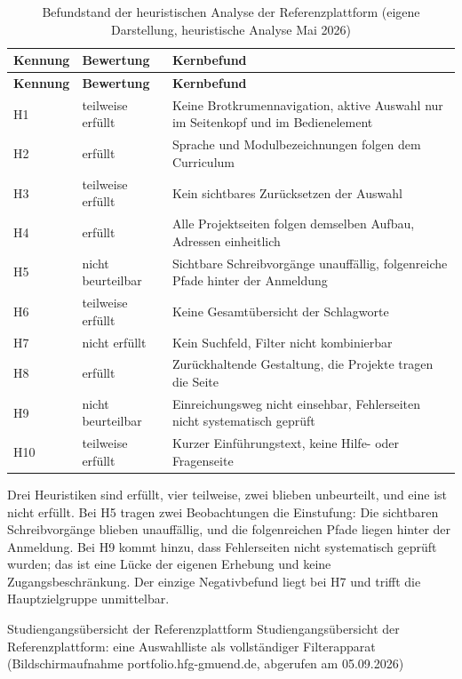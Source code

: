 \begingroup
\small
\setlength{\tabcolsep}{4pt}
\begin{longtable}{@{}L{1.7cm}L{3.1cm}L{9.6cm}@{}}
	\caption[Befundstand der heuristischen Analyse der Referenzplattform]{Befundstand der heuristischen Analyse der Referenzplattform (eigene Darstellung, heuristische Analyse Mai 2026)}
	\label{tab:hfg-befunde}\\
	\toprule
	\textbf{Kennung} & \textbf{Bewertung} & \textbf{Kernbefund} \\
	\midrule
	\endfirsthead
	\toprule
	\textbf{Kennung} & \textbf{Bewertung} & \textbf{Kernbefund} \\
	\midrule
	\endhead
	\bottomrule
	\endfoot
	H1 & teilweise erfüllt & Keine Brotkrumennavigation, aktive Auswahl nur im Seitenkopf und im Bedienelement \\
	H2 & erfüllt & Sprache und Modulbezeichnungen folgen dem Curriculum \\
	H3 & teilweise erfüllt & Kein sichtbares Zurücksetzen der Auswahl \\
	H4 & erfüllt & Alle Projektseiten folgen demselben Aufbau, Adressen einheitlich \\
	H5 & nicht beurteilbar & Sichtbare Schreibvorgänge unauffällig, folgenreiche Pfade hinter der Anmeldung \\
	H6 & teilweise erfüllt & Keine Gesamtübersicht der Schlagworte \\
	H7 & nicht erfüllt & Kein Suchfeld, Filter nicht kombinierbar \\
	H8 & erfüllt & Zurückhaltende Gestaltung, die Projekte tragen die Seite \\
	H9 & nicht beurteilbar & Einreichungsweg nicht einsehbar, Fehlerseiten nicht systematisch geprüft \\
	H10 & teilweise erfüllt & Kurzer Einführungstext, keine Hilfe- oder Fragenseite \\
\end{longtable}
\endgroup

Drei Heuristiken sind erfüllt, vier teilweise, zwei blieben unbeurteilt, und eine ist nicht erfüllt. Bei H5 tragen zwei Beobachtungen die Einstufung: Die sichtbaren Schreibvorgänge blieben unauffällig, und die folgenreichen Pfade liegen hinter der Anmeldung. Bei H9 kommt hinzu, dass Fehlerseiten nicht systematisch geprüft wurden; das ist eine Lücke der eigenen Erhebung und keine Zugangsbeschränkung. Der einzige Negativbefund liegt bei H7 und trifft die Hauptzielgruppe unmittelbar.

%
{Studiengangsübersicht der Referenzplattform}%
{Studiengangsübersicht der Referenzplattform: eine Auswahlliste als vollständiger Filterapparat (Bildschirmaufnahme portfolio.hfg-gmuend.de, abgerufen am 05.09.2026)}

